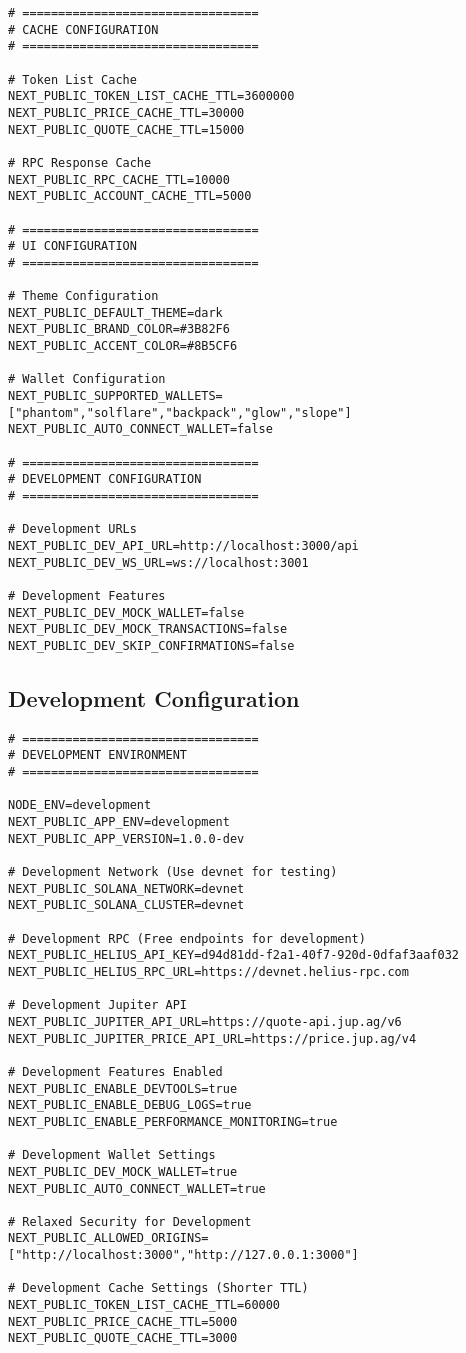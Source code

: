 \documentclass[11pt,a4paper]{article}
\begin{document}
\begin{lstlisting}[style=env, caption=.env.local (Production)]
# =================================
# CACHE CONFIGURATION
# =================================

# Token List Cache
NEXT_PUBLIC_TOKEN_LIST_CACHE_TTL=3600000
NEXT_PUBLIC_PRICE_CACHE_TTL=30000
NEXT_PUBLIC_QUOTE_CACHE_TTL=15000

# RPC Response Cache
NEXT_PUBLIC_RPC_CACHE_TTL=10000
NEXT_PUBLIC_ACCOUNT_CACHE_TTL=5000

# =================================
# UI CONFIGURATION
# =================================

# Theme Configuration
NEXT_PUBLIC_DEFAULT_THEME=dark
NEXT_PUBLIC_BRAND_COLOR=#3B82F6
NEXT_PUBLIC_ACCENT_COLOR=#8B5CF6

# Wallet Configuration
NEXT_PUBLIC_SUPPORTED_WALLETS=["phantom","solflare","backpack","glow","slope"]
NEXT_PUBLIC_AUTO_CONNECT_WALLET=false

# =================================
# DEVELOPMENT CONFIGURATION
# =================================

# Development URLs
NEXT_PUBLIC_DEV_API_URL=http://localhost:3000/api
NEXT_PUBLIC_DEV_WS_URL=ws://localhost:3001

# Development Features
NEXT_PUBLIC_DEV_MOCK_WALLET=false
NEXT_PUBLIC_DEV_MOCK_TRANSACTIONS=false
NEXT_PUBLIC_DEV_SKIP_CONFIRMATIONS=false
\end{lstlisting}

\subsection{Development Configuration}

\begin{lstlisting}[style=env, caption=.env.development]
# =================================
# DEVELOPMENT ENVIRONMENT
# =================================

NODE_ENV=development
NEXT_PUBLIC_APP_ENV=development
NEXT_PUBLIC_APP_VERSION=1.0.0-dev

# Development Network (Use devnet for testing)
NEXT_PUBLIC_SOLANA_NETWORK=devnet
NEXT_PUBLIC_SOLANA_CLUSTER=devnet

# Development RPC (Free endpoints for development)
NEXT_PUBLIC_HELIUS_API_KEY=d94d81dd-f2a1-40f7-920d-0dfaf3aaf032
NEXT_PUBLIC_HELIUS_RPC_URL=https://devnet.helius-rpc.com

# Development Jupiter API
NEXT_PUBLIC_JUPITER_API_URL=https://quote-api.jup.ag/v6
NEXT_PUBLIC_JUPITER_PRICE_API_URL=https://price.jup.ag/v4

# Development Features Enabled
NEXT_PUBLIC_ENABLE_DEVTOOLS=true
NEXT_PUBLIC_ENABLE_DEBUG_LOGS=true
NEXT_PUBLIC_ENABLE_PERFORMANCE_MONITORING=true

# Development Wallet Settings
NEXT_PUBLIC_DEV_MOCK_WALLET=true
NEXT_PUBLIC_AUTO_CONNECT_WALLET=true

# Relaxed Security for Development
NEXT_PUBLIC_ALLOWED_ORIGINS=["http://localhost:3000","http://127.0.0.1:3000"]

# Development Cache Settings (Shorter TTL)
NEXT_PUBLIC_TOKEN_LIST_CACHE_TTL=60000
NEXT_PUBLIC_PRICE_CACHE_TTL=5000
NEXT_PUBLIC_QUOTE_CACHE_TTL=3000
\end{lstlisting}
\end{document}
